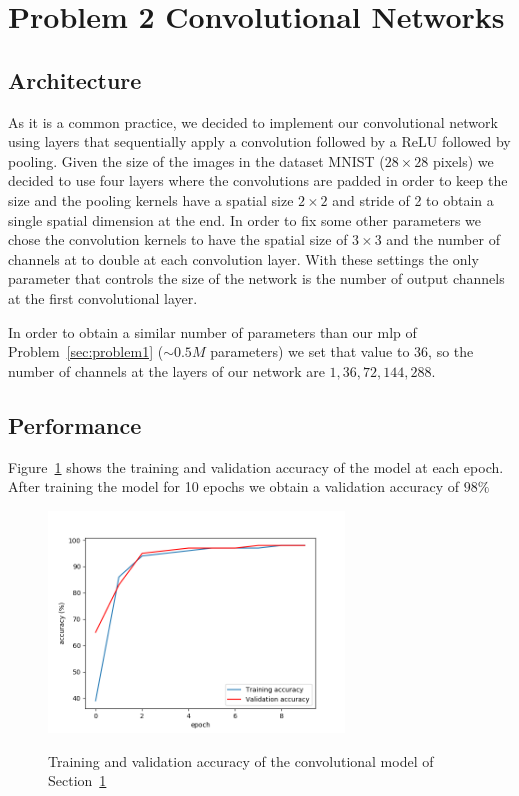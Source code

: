 \documentclass[a4paper]{article}
\begin{document}
\section{Problem 2 Convolutional Networks}
\label{sec:problem2}
\subsection{Architecture}
As it is a common practice, we decided to implement our convolutional network using layers that sequentially apply a convolution followed by a ReLU followed by pooling.
Given the size of the images in the dataset MNIST ($28\times28$ pixels) we decided to use four layers where the convolutions are padded in order to keep the size and the pooling kernels have a spatial size $2\times2$ and stride of 2 to obtain a single spatial dimension at the end. In order to fix some other parameters we chose the convolution kernels to have the spatial size of $3\times3$ and the number of channels at to double at each convolution layer. With these settings the only parameter that controls the size of the network is the number of output channels at the first convolutional layer. 

In order to obtain a similar number of parameters than our mlp of Problem~\ref{sec:problem1} ($\sim0.5M$ parameters) we set that value to $36$, so the number of channels at the layers of our network are  $1,36,72,144,288$. 
\subsection{Performance}
Figure~\ref{fig:CNN_accuracy} shows the training and validation accuracy of the model at each epoch. After training the model for 10 epochs we obtain a validation accuracy of $98\%$

\begin{figure}[h!]
\centering
\includegraphics[width=0.7\textwidth]{P2_CNN_accuracySGD_Ni36}
\label{fig:CNN_accuracy}
\caption{Training and validation accuracy of the convolutional model of Section~\ref{sec:problem2}}
\end{figure}
\end{document}
